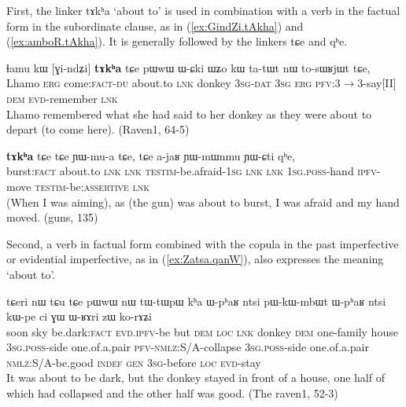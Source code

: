 \documentclass[oldfontcommands,oneside,a4paper,11pt]{article}
\newcommand{\ipa}[1]{{\phon \mbox{#1}}} %
\newcommand{\refb}[1]{(\ref{#1})}
\begin{document}
First, the linker \ipa{tɤkʰa} `about to'  is used in combination with a verb in the factual form in the subordinate clause, as in \refb{ex:GindZi.tAkha} and \refb{ex:amboR.tAkha}. It is generally followed by the linkers \ipa{tɕe} and \ipa{qʰe}. 
     \begin{exe}
\ex \label{ex:GindZi.tAkha}
\gll
\ipa{ɬamu}   	\ipa{kɯ}   	[\ipa{ɣi-ndʑi}]   	\textbf{\ipa{tɤkʰa}}   	\ipa{tɕe}   	\ipa{pɯwɯ}   	\ipa{ɯ-ɕki}   	\ipa{ɯʑo}   	\ipa{kɯ}   	\ipa{ta-tɯt}   	\ipa{nɯ}   	\ipa{to-sɯʁjɯt}   	\ipa{tɕe,}   	\\
Lhamo \textsc{erg} come:\textsc{fact}-\textsc{du} about.to \textsc{lnk} donkey \textsc{3sg-dat} \textsc{3sg} \textsc{erg} \textsc{pfv}:3$\rightarrow$3-say[II] \textsc{dem} \textsc{evd}-remember \textsc{lnk} \\
\glt  Lhamo remembered what she had said to her donkey as they were about to depart (to come here). (Raven1, 64-5)
\end{exe}

     \begin{exe}
\ex \label{ex:amboR.tAkha}
\gll
[\ipa{amboʁ}]   	\textbf{\ipa{tɤkʰa}}   	\ipa{tɕe}   	\ipa{tɕe}   	\ipa{ɲɯ-mu-a}   	\ipa{tɕe,}   	\ipa{tɕe}   	\ipa{a-jaʁ}   	\ipa{ɲɯ-mɯnmu}   	\ipa{ɲɯ-ɕti}   	\ipa{qʰe,}   \\
burst:\textsc{fact}  about.to \textsc{lnk}  \textsc{lnk} \textsc{testim}-be.afraid-\textsc{1sg}  \textsc{lnk}  \textsc{lnk} \textsc{1sg.poss}-hand \textsc{ipfv}-move \textsc{testim}-be:\textsc{assertive} \textsc{lnk} \\
\glt  (When I was aiming), as (the gun) was about to burst, I was afraid and my hand moved. (guns, 135)
\end{exe}




 
Second,  a verb in factual form combined with the copula in the past imperfective or evidential imperfective, as in \refb{ex:Zatsa.qanW}, also expresses the meaning `about to'.

     \begin{exe}
\ex \label{ex:Zatsa.qanW}
\gll
[\ipa{ʑatsa}  	\ipa{tɯmɯ}  	\ipa{qanɯ}]  	\ipa{\textbf{pjɤ-ŋu},}  	\ipa{tɕeri}  	\ipa{nɯ} \ipa{tɕu}  	\ipa{tɕe}  	\ipa{pɯwɯ}  	\ipa{nɯ}  	\ipa{tɯ-tɯpɯ}  	\ipa{kʰa}  	\ipa{ɯ-pʰaʁ}  	\ipa{ntsi}  	\ipa{pɯ-kɯ-mbɯt}  	\ipa{ɯ-pʰaʁ}  	\ipa{ntsi}  	\ipa{kɯ-pe}  	\ipa{ci}  	\ipa{ɣɯ}   	\ipa{ɯ-ʁɤri}  	\ipa{zɯ}  	\ipa{ko-rɤʑi}  \\
soon sky be.dark:\textsc{fact} \textsc{evd.ipfv}-be but \textsc{dem} \textsc{loc} \textsc{lnk} donkey \textsc{dem} one-family house \textsc{3sg.poss}-side one.of.a.pair \textsc{pfv-nmlz}:S/A-collapse  \textsc{3sg.poss}-side one.of.a.pair \textsc{nmlz}:S/A-be.good \textsc{indef}   \textsc{gen} \textsc{3sg}-before \textsc{loc} \textsc{evd}-stay \\
\glt It was about to be dark, but the donkey stayed in front of a house, one half of which had collapsed and the other half was good. (The raven1, 52-3)
 \end{exe}
\end{document}
